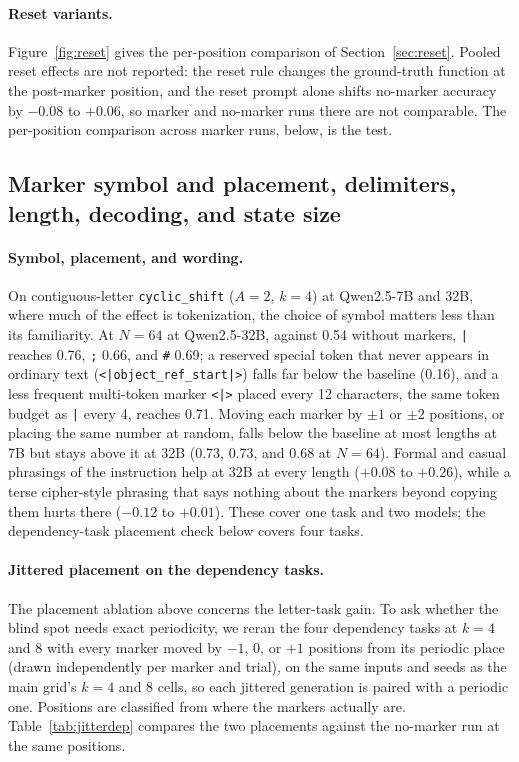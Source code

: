 \documentclass[10pt]{article} %
\newcommand{\task}[1]{\texttt{#1}}
\begin{document}
\paragraph{Reset variants.}\label{app:reset}
Figure~\ref{fig:reset} gives the per-position comparison of Section~\ref{sec:reset}. Pooled reset effects are not reported: the reset rule changes the ground-truth function at the post-marker position, and the reset prompt alone shifts no-marker accuracy by $-0.08$ to $+0.06$, so marker and no-marker runs there are not comparable. The per-position comparison across marker runs, below, is the test.

\FloatBarrier

\subsection{Marker symbol and placement, delimiters, length, decoding, and state size}
\label{app:marker}

\paragraph{Symbol, placement, and wording.} On contiguous-letter \task{cyclic\_shift} ($A = 2$, $k = 4$) at Qwen2.5-7B and 32B, where much of the effect is tokenization, the choice of symbol matters less than its familiarity. At $N = 64$ at Qwen2.5-32B, against 0.54 without markers, \texttt{|} reaches 0.76, \texttt{;} 0.66, and \texttt{\#} 0.69; a reserved special token that never appears in ordinary text (\texttt{<|object\_ref\_start|>}) falls far below the baseline (0.16), and a less frequent multi-token marker \texttt{<|>} placed every 12 characters, the same token budget as \texttt{|} every 4, reaches 0.71. Moving each marker by $\pm 1$ or $\pm 2$ positions, or placing the same number at random, falls below the baseline at most lengths at 7B but stays above it at 32B (0.73, 0.73, and 0.68 at $N = 64$). Formal and casual phrasings of the instruction help at 32B at every length ($+0.08$ to $+0.26$), while a terse cipher-style phrasing that says nothing about the markers beyond copying them hurts there ($-0.12$ to $+0.01$). These cover one task and two models; the dependency-task placement check below covers four tasks.

\paragraph{Jittered placement on the dependency tasks.} The placement ablation above concerns the letter-task gain. To ask whether the blind spot needs exact periodicity, we reran the four dependency tasks at $k = 4$ and 8 with every marker moved by $-1$, 0, or $+1$ positions from its periodic place (drawn independently per marker and trial), on the same inputs and seeds as the main grid's $k = 4$ and 8 cells, so each jittered generation is paired with a periodic one. Positions are classified from where the markers actually are. Table~\ref{tab:jitterdep} compares the two placements against the no-marker run at the same positions.
\end{document}
